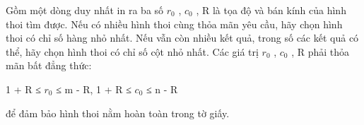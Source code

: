Gồm một dòng duy nhất in ra ba số $r_{0}$   , $c_{0}$   , R là tọa độ và bán kính của hình thoi tìm được. Nếu có nhiều hình thoi cùng thỏa mãn yêu cầu, hãy chọn hình thoi có chỉ số hàng nhỏ nhất. Nếu vẫn còn nhiều kết quả, trong số các kết quả có thể, hãy chọn hình thoi có chỉ số cột nhỏ nhất. Các giá trị $r_{0}$   , $c_{0}$   , R phải thỏa mãn bất đẳng thức:  

   1 + R ≤ $r_{0}$   ≤ m - R, 1 + R ≤ $c_{0}$   ≤ n - R  

   để đảm bảo hình thoi nằm hoàn toàn trong tờ giấy.